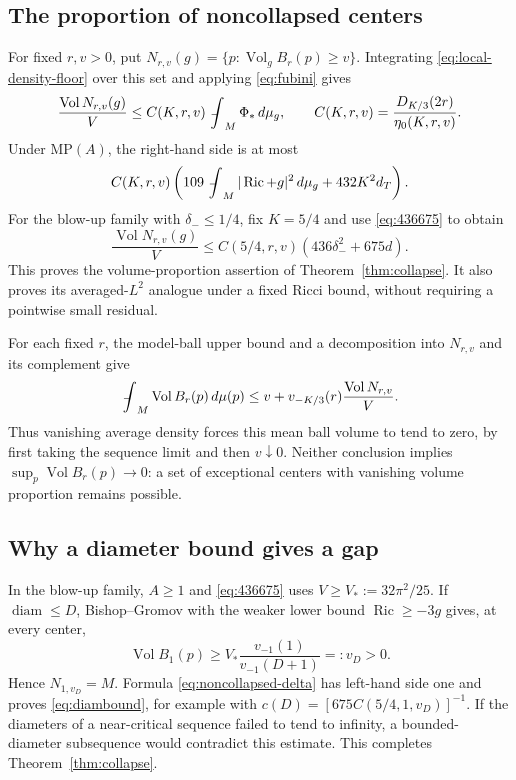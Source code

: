 \documentclass[a4paper,11pt]{article}
\numberwithin{equation}{section}
\theoremstyle{definition}
\newcommand{\Ric}{\operatorname{Ric}}
\newcommand{\Vol}{\operatorname{Vol}}
\newcommand{\diam}{\operatorname{diam}}
\newcommand{\dd}{\,d\mu_g}
\newcommand{\fint}{\mathop{\rlap{\,\raisebox{0.1ex}{\tiny$-$}}\int}\nolimits}
\begin{document}
\subsection{The proportion of noncollapsed centers}\label{sec:quantitative-collapse}
For fixed $r,v>0$, put
$N_{r,v}(g)=\{p:\Vol_gB_r(p)\ge v\}$. Integrating \eqref{eq:local-density-floor} over this set and applying \eqref{eq:fubini} gives
\begin{equation}\label{eq:noncollapsed-proportion}
\frac{\Vol N_{r,v}(g)}{V}
\le C(K,r,v)\fint_M\Phi_*\dd,
\qquad C(K,r,v)=\frac{D_{K/3}(2r)}{\eta_0(K,r,v)}.
\end{equation}
Under $\mathrm{MP}(A)$, the right-hand side is at most
\begin{equation}\label{eq:noncollapsed-L2}
C(K,r,v)\left(109\fint_M|\Ric+g|^2\dd+432K^2d_T\right).
\end{equation}
For the blow-up family with $\delta_-\le1/4$, fix $K=5/4$ and use \eqref{eq:436675} to obtain
\begin{equation}\label{eq:noncollapsed-delta}
\frac{\Vol N_{r,v}(g)}{V}\le C(5/4,r,v)(436\delta_-^2+675d).
\end{equation}
This proves the volume-proportion assertion of Theorem~\ref{thm:collapse}. It also proves its averaged-$L^2$ analogue under a fixed Ricci bound, without requiring a pointwise small residual.

For each fixed $r$, the model-ball upper bound and a decomposition into $N_{r,v}$ and its complement give
\[
\fint_M\Vol B_r(p)\,d\mu(p)
\le v+v_{-K/3}(r)\frac{\Vol N_{r,v}}{V}.
\]
Thus vanishing average density forces this mean ball volume to tend to zero, by first taking the sequence limit and then $v\downarrow0$. Neither conclusion implies $\sup_p\Vol B_r(p)\to0$: a set of exceptional centers with vanishing volume proportion remains possible.

\subsection{Why a diameter bound gives a gap}\label{sec:diameter-gap-proof}
In the blow-up family, $A\ge1$ and \eqref{eq:436675} uses
$V\ge V_*:=32\pi^2/25$. If $\diam\le D$, Bishop--Gromov with the weaker lower bound $\Ric\ge-3g$ gives, at every center,
\begin{equation}\label{eq:diameter-ball-lower}
\Vol B_1(p)\ge V_*\frac{v_{-1}(1)}{v_{-1}(D+1)}=:v_D>0.
\end{equation}
Hence $N_{1,v_D}=M$. Formula \eqref{eq:noncollapsed-delta} has left-hand side one and proves \eqref{eq:diambound}, for example with
$c(D)=[675C(5/4,1,v_D)]^{-1}$.
If the diameters of a near-critical sequence failed to tend to infinity, a bounded-diameter subsequence would contradict this estimate. This completes Theorem~\ref{thm:collapse}.
\end{document}

